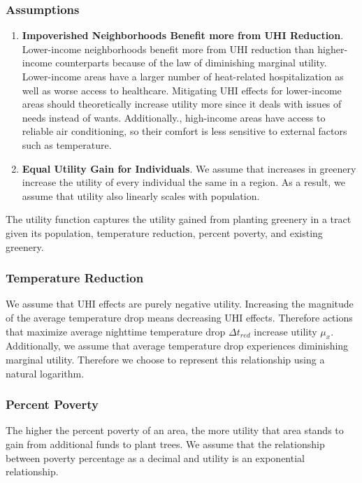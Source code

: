 \documentclass[11pt]{article}
\begin{document}
\subsubsection{Assumptions}
\begin{enumerate}
\item \textbf{Impoverished Neighborhoods Benefit more from UHI Reduction}.
Lower-income neighborhoods benefit more from UHI reduction than higher-income counterparts because of the law of diminishing marginal utility.
Lower-income areas have a larger number of heat-related hospitalization as well as worse access to healthcare. Mitigating UHI effects for lower-income areas should theoretically increase utility more since it deals with issues of needs instead of wants.
Additionally., high-income areas have access to reliable air conditioning, so their comfort is less sensitive to external factors such as temperature.

\item \textbf{Equal Utility Gain for Individuals}. We assume that increases in greenery increase the utility of every individual the same in a region. As a result, we assume that utility also linearly scales with population.
\end{enumerate}
The utility function captures the utility gained from planting greenery in a tract given its population, temperature reduction, percent poverty, and existing greenery.

\subsubsection{Temperature Reduction}
We assume that UHI effects are purely negative utility. Increasing the magnitude of the average temperature drop means decreasing UHI effects. Therefore actions that maximize average nighttime temperature drop $\Delta t_{red}$ increase utility $\mu_x$. Additionally, we assume that average temperature drop experiences diminishing marginal utility. Therefore we choose to represent this relationship using a natural logarithm.

\subsubsection{Percent Poverty}
The higher the percent poverty of an area, the more utility that area stands to gain from additional funds to plant trees. We assume that the relationship between poverty percentage as a decimal and utility is an exponential relationship.
\end{document}
